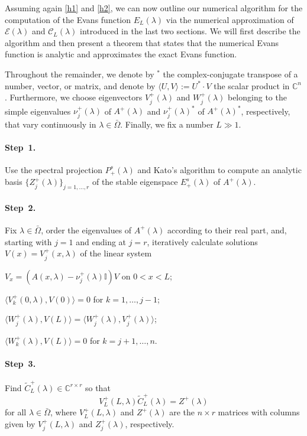 \documentclass[10pt]{article}
\numberwithin{equation}{section}
\def\id{\mathbb{I}}
\newcommand{\C}{\mathbb{C}}
\begin{document}
Assuming again \ref{h1} and \ref{h2}, we can now outline our numerical algorithm for the computation of the Evans function $E_L(\lambda)$ via the numerical approximation of $\mathcal{E}(\lambda)$ and $\mathcal{C}_L(\lambda)$ introduced in the last two sections. We will first describe the algorithm and then present a theorem that states that the numerical Evans function is analytic and approximates the exact Evans function.

Throughout the remainder, we denote by ${ }^*$ the complex-conjugate transpose of a number, vector, or matrix, and denote by $\langle U,V\rangle:=U^* \cdot V$ the scalar product in $\C^n$. Furthermore, we choose eigenvectors $V^+_j(\lambda)$ and $W^+_j(\lambda)$ belonging to the simple eigenvalues $\nu^+_j(\lambda)$ of $A^+(\lambda)$ and $\nu^+_j(\lambda)^*$ of $A^+(\lambda)^*$, respectively, that vary continuously in $\lambda\in\bar\Omega$. Finally, we fix a number $L\gg1$.

\paragraph{Step~1.} Use the spectral projection $P^s_+(\lambda)$ and Kato's algorithm \cite[Ch.~II.4.2]{Kato} to compute an analytic basis $\{Z^+_j(\lambda)\}_{j=1,\ldots,r}$  of the stable eigenspace $E^s_+(\lambda)$ of $A^+(\lambda)$.

\paragraph{Step~2.} Fix $\lambda\in\bar\Omega$, order the eigenvalues of $A^+(\lambda)$ according to their real part, and, starting with $j=1$ and ending at $j=r$, iteratively calculate solutions $V(x)=V^+_j(x,\lambda)$ of the linear system
\begin{compactenum}
\item $V_x=(A(x,\lambda)-\nu^+_j(\lambda)\id)V$ on $0<x<L$;
\item $\langle V^+_k(0,\lambda),V(0)\rangle=0$ for $k=1,\ldots,j-1$;
\item $\langle W^+_j(\lambda),V(L)\rangle=\langle W^+_j(\lambda),V^+_j(\lambda)\rangle$;
\item $\langle W^+_k(\lambda),V(L)\rangle=0$ for $k=j+1,\ldots,n$.
\end{compactenum}

\paragraph{Step~3.} Find $\tilde{C}^+_L(\lambda)\in\C^{r\times r}$ so that
\begin{equation}\label{e81}
V^+_L(L,\lambda) \tilde{C}^+_L(\lambda) = Z^+(\lambda)
\end{equation}
for all $\lambda\in\bar\Omega$, where $V^+_L(L,\lambda)$ and $Z^+(\lambda)$ are the $n\times r$ matrices with columns given by $V^+_j(L,\lambda)$ and $Z^+_j(\lambda)$, respectively.
\end{document}
